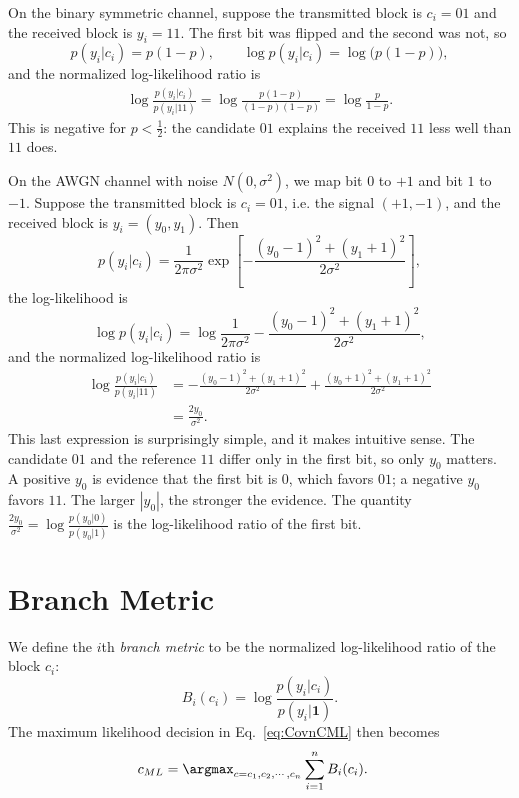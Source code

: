 \begin{example}
On the binary symmetric channel, suppose the transmitted block is \(c_i = 01\) and the received block is \(y_i = 11\). The first bit was flipped and the second was not, so
\[p(y_i|c_i) = p(1-p), \qquad \log p(y_i|c_i) = \log\big(p(1-p)\big),\]
and the normalized log-likelihood ratio is
\begin{align*}
\log \frac{p(y_i|c_i)}{p(y_i|11)} = \log \frac{p(1-p)}{(1-p)(1-p)} = \log \frac{p}{1-p}.
\end{align*}
This is negative for \(p < \frac{1}{2}\): the candidate \(01\) explains the received \(11\) less well than \(11\) does.
\end{example}

\begin{example}
On the AWGN channel with noise \(N(0, \sigma^2)\), we map bit \(0\) to \(+1\) and bit \(1\) to \(-1\). Suppose the transmitted block is \(c_i = 01\), i.e. the signal \((+1, -1)\), and the received block is \(y_i = (y_0, y_1)\). Then
\[p(y_i|c_i) = \frac{1}{2\pi\sigma^2} \exp\left[-\frac{(y_0-1)^2+(y_1 + 1)^2}{2\sigma^2}\right],\]
the log-likelihood is
\[\log p(y_i|c_i) = \log\frac{1}{2\pi\sigma^2} -\frac{(y_0-1)^2+(y_1 + 1)^2}{2\sigma^2},\]
and the normalized log-likelihood ratio is
\begin{align*}
\log \frac{p(y_i|c_i)}{p(y_i|11)} &= -\frac{(y_0-1)^2+(y_1 + 1)^2}{2\sigma^2} + \frac{(y_0+1)^2+(y_1 + 1)^2}{2\sigma^2} \\
&= \frac{2y_0}{\sigma^2}.
\end{align*}
This last expression is surprisingly simple, and it makes intuitive sense. The candidate \(01\) and the reference \(11\) differ only in the first bit, so only \(y_0\) matters. A positive \(y_0\) is evidence that the first bit is \(0\), which favors \(01\); a negative \(y_0\) favors \(11\). The larger \(|y_0|\), the stronger the evidence. The quantity \(\frac{2y_0}{\sigma^2} = \log \frac{p(y_0|0)}{p(y_0|1)}\) is the log-likelihood ratio of the first bit.
\end{example}

\section{Branch Metric}\label{sec:branch}
We define the \(i\)th \emph{branch metric} to be the normalized log-likelihood ratio of the block \(c_i\):
\begin{equation}
  B_i(c_i) = \log \frac{p(y_i|c_i)}{p(y_i|\mathbf{1})}. \label{eq:BranchMetric}
\end{equation}
The maximum likelihood decision in Eq.~\ref{eq:CovnCML} then becomes
\begin{align}
    c_{ML} &=\argmax_{c=c_1, c_2, \cdots, c_n} \sum_{i=1}^{n} B_i(c_i). \label{eq:ConvBranchML}
\end{align}

